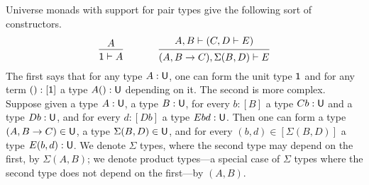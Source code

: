 \documentclass[11pt, one side, article]{memoir}
\theoremstyle{definition}
\theoremstyle{plain}
\newcommand{\tn}[1]{\textnormal{#1}}
\newcommand{\0}{\textsf{0}}
\newcommand{\1}{\tn{\textsf{1}}}
\newcommand{\U}{\tn{\textsf{U}}}
\begin{document}
Universe monads with support for pair types give the following sort of constructors.%
\begin{equation}\label{eqn.premise_axiom}
  \begin{prooftree}
    \Hypo{A}
    \Infer1{\1\vdash A}
  \end{prooftree}
\hspace{.5in}
  \begin{prooftree}
    \Hypo{A, B\vdash (C, D\vdash E)}
    \Infer1{(A,B\to C),\Sigma(B,D)\vdash E}
  \end{prooftree}
\end{equation}
The first says that for any type $A:\U$, one can form the unit type $\1$ and for any term $():[\1]$ a type $A():\U$ depending on it. The second is more complex. Suppose given a type $A:\U$, a type $B:\U$, for every $b:[B]$ a type $Cb:\U$ and a type $Db:\U$, and for every $d:[Db]$ a type $Ebd:\U$. Then one can form a type $(A,B\to C)\in \U$, a type $\Sigma(B,D)\in \U$, and for every $(b, d)\in [\Sigma(B,D)]$ a type $E(b,d):\U$. We denote $\Sigma$ types, where the second type may depend on the first, by $\Sigma(A,B)$; we denote product types---a special case of $\Sigma$ types where the second type does not depend on the first---by $(A,B)$.
\end{document}
